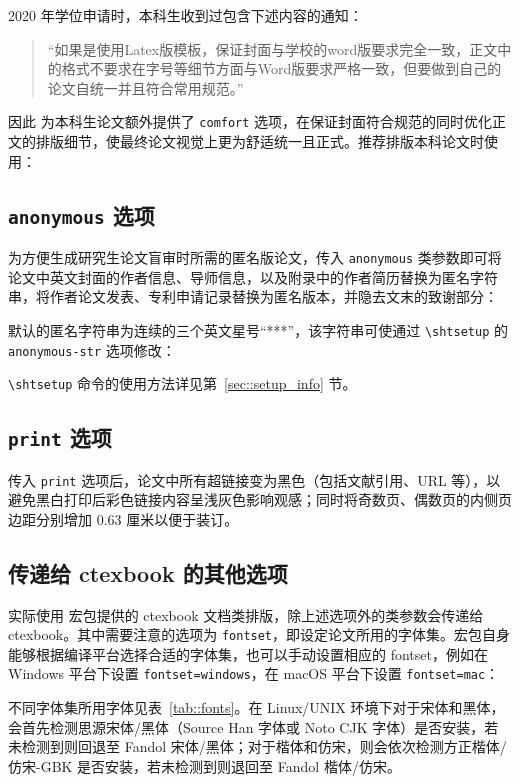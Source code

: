 \documentclass[master]{shtthesis}
\begin{document}
2020 年学位申请时，本科生收到过包含下述内容的通知：
\begin{quotation}
“如果是使用Latex版模板，保证封面与学校的word版要求完全一致，正文中的格式不要求在字号等细节方面与Word版要求严格一致，但要做到自己的论文自统一并且符合常用规范。”
\end{quotation}
因此 \shtthesis{} 为本科生论文额外提供了 \verb|comfort| 选项，在保证封面符合规范的同时优化正文的排版细节，使最终论文视觉上更为舒适统一且正式。推荐排版本科论文时使用：

\subsection{\texttt{anonymous} 选项} \label{sec::option_anonymous}
为方便生成研究生论文盲审时所需的匿名版论文，传入 \verb|anonymous| 类参数即可将论文中英文封面的作者信息、导师信息，以及附录中的作者简历替换为匿名字符串，将作者论文发表、专利申请记录替换为匿名版本，并隐去文末的致谢部分：
\shtthesis{} 默认的匿名字符串为连续的三个英文星号“***”，该字符串可使通过 \verb|\shtsetup| 的 \verb|anonymous-str| 选项修改：
\begin{latex}
\end{latex}
\verb|\shtsetup| 命令的使用方法详见第~\ref{sec::setup_info} 节。

\subsection{\texttt{print} 选项}
传入 \verb|print| 选项后，论文中所有超链接变为黑色（包括文献引用、URL 等），以避免黑白打印后彩色链接内容呈浅灰色影响观感；同时将奇数页、偶数页的内侧页边距分别增加 0.63 厘米以便于装订。

\subsection{传递给 \textsf{ctexbook} 的其他选项}
\shtthesis{} 实际使用 \CTeX 宏包提供的 \textsf{ctexbook} 文档类排版，除上述选项外的类参数会传递给 \textsf{ctexbook}。其中需要注意的选项为 \verb|fontset|，即设定论文所用的字体集。\CTeX 宏包自身能够根据编译平台选择合适的字体集，也可以手动设置相应的 fontset，例如在 Windows 平台下设置 \verb|fontset=windows|，在 macOS 平台下设置 \verb|fontset=mac|：
不同字体集所用字体见表~\ref{tab::fonts}。在 Linux/UNIX 环境下对于宋体和黑体，会首先检测思源宋体/黑体（Source Han 字体或 Noto CJK 字体）是否安装，若未检测到则回退至 Fandol 宋体/黑体；对于楷体和仿宋，则会依次检测方正楷体/仿宋-GBK 是否安装，若未检测到则退回至 Fandol 楷体/仿宋。
\end{document}
